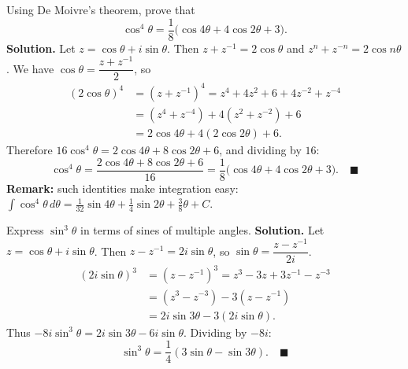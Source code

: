 \documentclass[11pt]{article}
\begin{document}
\begin{exoresolu}
Using De Moivre's theorem, prove that
\[ \cos^4\theta = \frac{1}{8}\bigl(\cos 4\theta + 4\cos 2\theta + 3\bigr). \]
\tcblower
\textbf{Solution.} Let $z = \cos\theta + i\sin\theta$. Then $z + z^{-1} = 2\cos\theta$ and $z^n + z^{-n} = 2\cos n\theta$. We have $\cos\theta = \dfrac{z + z^{-1}}{2}$, so
\begin{align*}
(2\cos\theta)^4 &= (z + z^{-1})^4 = z^4 + 4z^2 + 6 + 4z^{-2} + z^{-4} \\
&= (z^4 + z^{-4}) + 4(z^2 + z^{-2}) + 6 \\
&= 2\cos 4\theta + 4(2\cos 2\theta) + 6.
\end{align*}
Therefore $16\cos^4\theta = 2\cos 4\theta + 8\cos 2\theta + 6$, and dividing by $16$:
\[ \cos^4\theta = \frac{2\cos 4\theta + 8\cos 2\theta + 6}{16} = \frac{1}{8}\bigl(\cos 4\theta + 4\cos 2\theta + 3\bigr). \quad\blacksquare \]
\textbf{Remark:} such identities make integration easy: $\displaystyle\int \cos^4\theta\, d\theta = \tfrac{1}{32}\sin 4\theta + \tfrac{1}{4}\sin 2\theta + \tfrac{3}{8}\theta + C$.
\end{exoresolu}

\begin{exoresolu}
Express $\sin^3\theta$ in terms of sines of multiple angles.
\tcblower
\textbf{Solution.} Let $z = \cos\theta + i\sin\theta$. Then $z - z^{-1} = 2i\sin\theta$, so $\sin\theta = \dfrac{z - z^{-1}}{2i}$.
\begin{align*}
(2i\sin\theta)^3 &= (z - z^{-1})^3 = z^3 - 3z + 3z^{-1} - z^{-3} \\
&= (z^3 - z^{-3}) - 3(z - z^{-1}) \\
&= 2i\sin 3\theta - 3(2i\sin\theta).
\end{align*}
Thus $-8i\sin^3\theta = 2i\sin 3\theta - 6i\sin\theta$. Dividing by $-8i$:
\[ \sin^3\theta = \frac{1}{4}(3\sin\theta - \sin 3\theta). \quad\blacksquare \]
\end{exoresolu}
\end{document}
